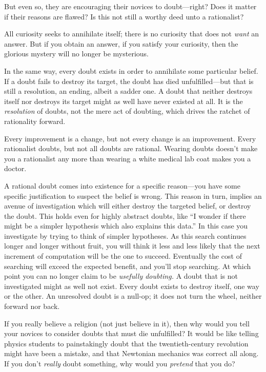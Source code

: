 {
 But even so, they are encouraging their novices to doubt---right?
Does it matter if their reasons are flawed? Is this not still a worthy
deed unto a rationalist?}

{
 All curiosity seeks to annihilate itself; there is no curiosity
that does not \textit{want} an answer. But if you obtain an answer, if
you satisfy your curiosity, then the glorious mystery will no longer be
mysterious.}

{
 In the same way, every doubt exists in order to annihilate some
particular belief. If a doubt fails to destroy its target, the doubt
has died unfulfilled---but that is still a resolution, an ending,
albeit a sadder one. A doubt that neither destroys itself nor destroys
its target might as well have never existed at all. It is the
\textit{resolution} of doubts, not the mere act of doubting, which
drives the ratchet of rationality forward.}

{
 Every improvement is a change, but not every change is an
improvement. Every rationalist doubts, but not all doubts are rational.
Wearing doubts doesn't make you a rationalist any more
than wearing a white medical lab coat makes you a doctor.}

{
 A rational doubt comes into existence for a specific reason---you
have some specific justification to suspect the belief is wrong. This
reason in turn, implies an avenue of investigation which will either
destroy the targeted belief, or destroy the doubt. This holds even for
highly abstract doubts, like ``I wonder if there might
be a simpler hypothesis which also explains this
data.'' In this case you investigate by trying to
think of simpler hypotheses. As this search continues longer and longer
without fruit, you will think it less and less likely that the next
increment of computation will be the one to succeed. Eventually the
cost of searching will exceed the expected benefit, and
you'll stop searching. At which point you can no longer
claim to be \textit{usefully doubting.} A doubt that is not
investigated might as well not exist. Every doubt exists to destroy
itself, one way or the other. An unresolved doubt is a null-op; it does
not turn the wheel, neither forward nor back.}

{
 If you really believe a religion (not just believe in it), then
why would you tell your novices to consider doubts that must die
unfulfilled? It would be like telling physics students to painstakingly
doubt that the twentieth-century revolution might have been a mistake,
and that Newtonian mechanics was correct all along. If you
don't \textit{really} doubt something, why would you
\textit{pretend} that you do?}

